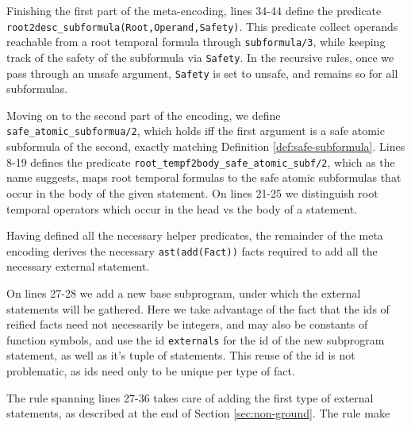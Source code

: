 Finishing the first part of the meta-encoding, lines 34-44 define the
predicate \verb|root2desc_subformula(Root,Operand,Safety)|. This
predicate collect operands reachable from a root temporal formula
through \verb|subformula/3|, while keeping track of the safety of the
subformula via \verb|Safety|. In the recursive rules, once we pass
through an unsafe argument, \verb|Safety| is set to unsafe, and
remains so for all subformulas.

Moving on to the second part of the encoding, we define
\texttt{safe\_atomic\_subformua/2}, which holds iff the first argument
is a safe atomic subformula of the second, exactly matching Definition
\ref{def:safe-subformula}. Lines 8-19 defines the predicate
\texttt{root\_tempf2body\_safe\_atomic\_subf/2}, which as the name
suggests, maps root temporal formulas to the safe atomic subformulas
that occur in the body of the given statement. On lines 21-25 we
distinguish root temporal operators which occur in the head vs the
body of a statement.

Having defined all the necessary helper predicates, the remainder of
the meta encoding derives the necessary \texttt{ast(add(Fact))} facts
required to add all the necessary external statement.

On lines 27-28 we add a new base subprogram, under which the external
statements will be gathered. Here we take advantage of the fact that
the ids of reified facts need not necessarily be integers, and may
also be constants of function symbols, and use the id
\texttt{externals} for the id of the new subprogram statement, as well
as it's tuple of statements. This reuse of the id is not problematic,
as ids need only to be unique per type of fact.

The rule spanning lines 27-36 takes care of adding the first type of
external statements, as described at the end of Section
\ref{sec:non-ground}. The rule make

